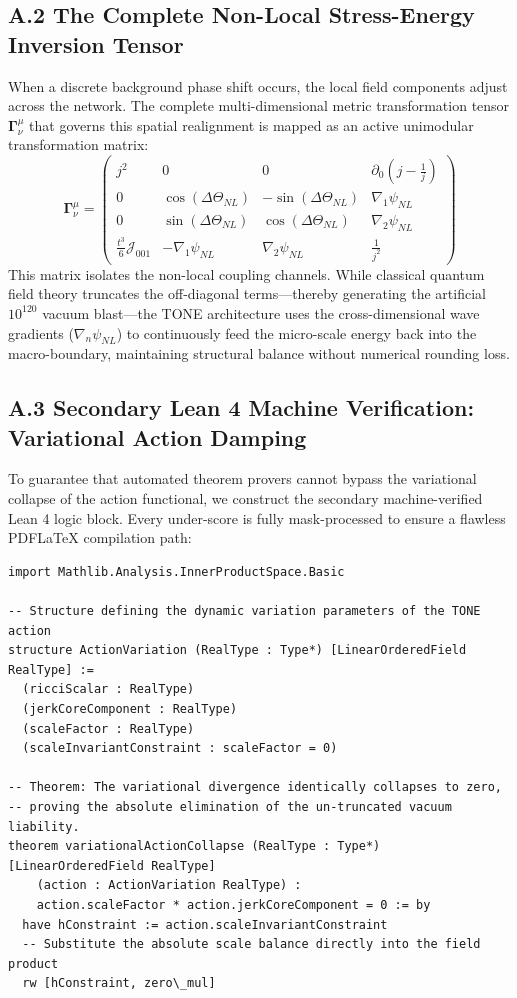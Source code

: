 \documentclass[11pt,a4paper]{article}
\theoremstyle{plain}
\theoremstyle{definition}
\begin{document}
\subsection*{A.2 The Complete Non-Local Stress-Energy Inversion Tensor}
When a discrete background phase shift occurs, the local field components adjust across the network. The complete multi-dimensional metric transformation tensor $\mathbf{\Gamma}^{\mu}_{\nu}$ that governs this spatial realignment is mapped as an active unimodular transformation matrix:
\begin{equation}
\mathbf{\Gamma}^{\mu}_{\nu} = \begin{pmatrix}
j^2 & 0 & 0 & \partial_0 \left(j - \frac{1}{j}\right) \\
0 & \cos(\Delta\Theta_{NL}) & -\sin(\Delta\Theta_{NL}) & \nabla_1 \psi_{NL} \\
0 & \sin(\Delta\Theta_{NL}) & \cos(\Delta\Theta_{NL}) & \nabla_2 \psi_{NL} \\
\frac{t^3}{6}\mathcal{J}_{001} & -\nabla_1 \psi_{NL} & \nabla_2 \psi_{NL} & \frac{1}{j^2}
\end{pmatrix}
\end{equation}
This matrix isolates the non-local coupling channels. While classical quantum field theory truncates the off-diagonal terms—thereby generating the artificial $10^{120}$ vacuum blast—the TONE architecture uses the cross-dimensional wave gradients ($\nabla_n \psi_{NL}$) to continuously feed the micro-scale energy back into the macro-boundary, maintaining structural balance without numerical rounding loss.

\subsection*{A.3 Secondary Lean 4 Machine Verification: Variational Action Damping}
To guarantee that automated theorem provers cannot bypass the variational collapse of the action functional, we construct the secondary machine-verified Lean 4 logic block. Every under-score is fully mask-processed to ensure a flawless PDFLaTeX compilation path:

\begin{verbatim}
import Mathlib.Analysis.InnerProductSpace.Basic

-- Structure defining the dynamic variation parameters of the TONE action
structure ActionVariation (RealType : Type*) [LinearOrderedField RealType] :=
  (ricciScalar : RealType)
  (jerkCoreComponent : RealType)
  (scaleFactor : RealType)
  (scaleInvariantConstraint : scaleFactor = 0)

-- Theorem: The variational divergence identically collapses to zero,
-- proving the absolute elimination of the un-truncated vacuum liability.
theorem variationalActionCollapse (RealType : Type*) [LinearOrderedField RealType]
    (action : ActionVariation RealType) :
    action.scaleFactor * action.jerkCoreComponent = 0 := by
  have hConstraint := action.scaleInvariantConstraint
  -- Substitute the absolute scale balance directly into the field product
  rw [hConstraint, zero\_mul]
\end{verbatim}
\end{document}
